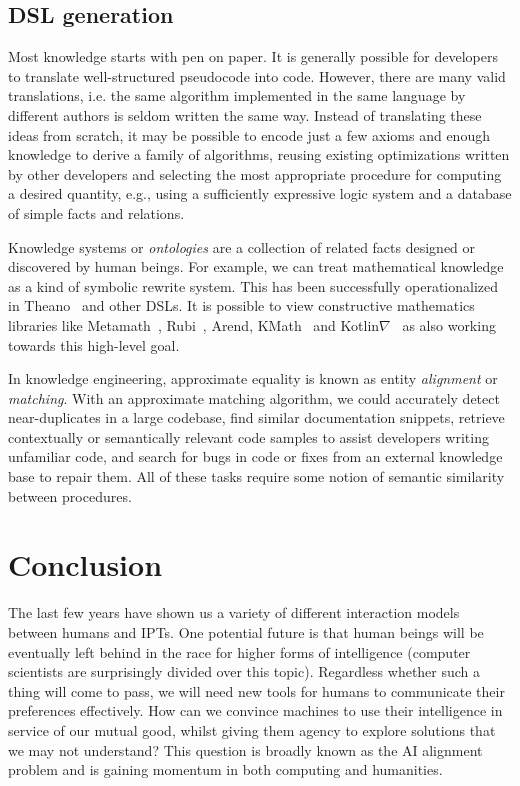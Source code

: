 \documentclass[10pt]{article}
\begin{document}
  \subsection{DSL generation}\label{subsec:gen}

Most knowledge starts with pen on paper. It is generally possible for developers to translate well-structured pseudocode into code. However, there are many valid translations, i.e. the same algorithm implemented in the same language by different authors is seldom written the same way. Instead of translating these ideas from scratch, it may be possible to encode just a few axioms and enough knowledge to derive a family of algorithms, reusing existing optimizations written by other developers and selecting the most appropriate procedure for computing a desired quantity, e.g., using a sufficiently expressive logic system and a database of simple facts and relations.

Knowledge systems or \textit{ontologies} are a collection of related facts designed or discovered by human beings. For example, we can treat mathematical knowledge as a kind of symbolic rewrite system. This has been successfully operationalized in Theano~\cite{bergstra2010theano} and other DSLs. It is possible to view constructive mathematics libraries like Metamath~\cite{megill2006metamath}, Rubi~\cite{rich2009knowledge}, Arend, KMath~\cite{nozik2019kotlin} and Kotlin$\nabla$~\cite{considine2019kotlingrad} as also working towards this high-level goal.

In knowledge engineering, approximate equality is known as entity \textit{alignment} or \textit{matching}. With an approximate matching algorithm, we could accurately detect near-duplicates in a large codebase, find similar documentation snippets, retrieve contextually or semantically relevant code samples to assist developers writing unfamiliar code, and search for bugs in code or fixes from an external knowledge base to repair them. All of these tasks require some notion of semantic similarity between procedures.

\section{Conclusion}

The last few years have shown us a variety of different interaction models between humans and IPTs. One potential future is that human beings will be eventually left behind in the race for higher forms of intelligence (computer scientists are surprisingly divided over this topic). Regardless whether such a thing will come to pass, we will need new tools for humans to communicate their preferences effectively. How can we convince machines to use their intelligence in service of our mutual good, whilst giving them agency to explore solutions that we may not understand? This question is broadly known as the AI alignment problem and is gaining momentum in both computing and humanities.
\end{document}
